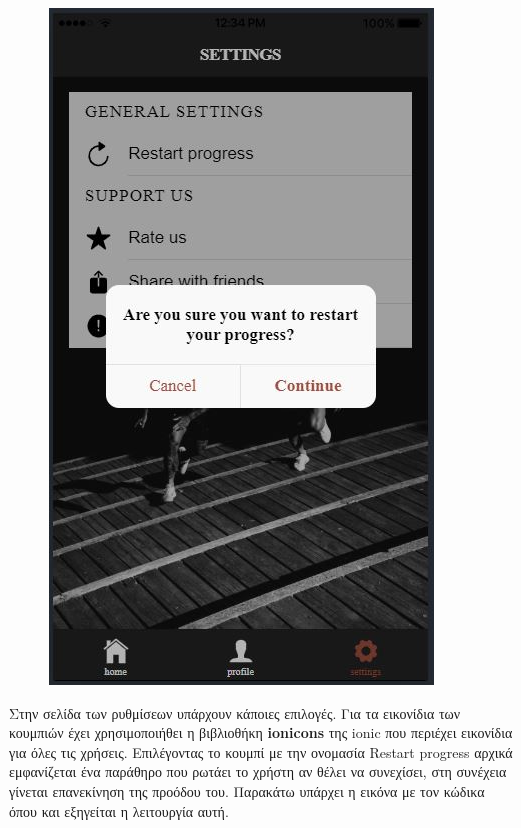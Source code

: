 \documentclass[a4paper,12pt]{article}
\begin{document}
\begin{figure}[!htb]
			  \includegraphics[width=\linewidth]{settings3}
			\endminipage\hfill
		\end{figure}
		\vspace*{1cm}

		Στην σελίδα των ρυθμίσεων υπάρχουν κάποιες επιλογές. Για τα εικονίδια των κουμπιών έχει χρησιμοποιήθει η βιβλιοθήκη
		\textbf{ionicons} της ionic που περιέχει εικονίδια για όλες τις χρήσεις.
		Επιλέγοντας το κουμπί με την ονομασία Restart progress αρχικά εμφανίζεται ένα παράθηρο που ρωτάει το χρήστη αν θέλει να συνεχίσει, στη συνέχεια
		γίνεται επανεκίνηση της προόδου του. Παρακάτω υπάρχει η εικόνα με τον κώδικα όπου και εξηγείται η λειτουργία αυτή. 
		\clearpage
\end{document}
